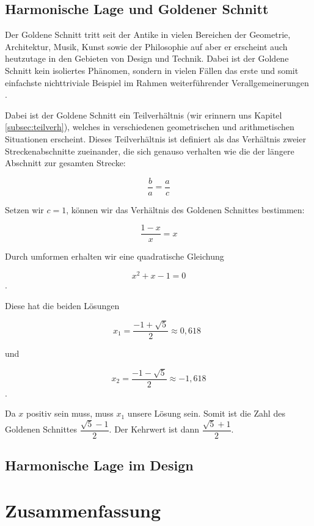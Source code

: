 \documentclass[12pt,a4paper]{article}
\begin{document}
\subsection{Harmonische Lage und Goldener Schnitt}
Der Goldene Schnitt tritt seit der Antike in  vielen Bereichen der Geometrie, Architektur, Musik, Kunst sowie der Philosophie auf aber er erscheint auch heutzutage in den Gebieten von Design und Technik. Dabei ist der Goldene Schnitt kein isoliertes Phänomen, sondern in vielen Fällen das erste und somit einfachste nichttriviale Beispiel im Rahmen weiterführender Verallgemeinerungen \citep[s.][S.~5]{goldenerSchnitt}.

Dabei ist der Goldene Schnitt ein Teilverhältnis (wir erinnern uns Kapitel \ref{subsec:teilverh}), welches in verschiedenen geometrischen und arithmetischen Situationen erscheint. Dieses Teilverhältnis ist definiert als das Verhältnis zweier Streckenabschnitte zueinander, die sich genauso verhalten wie die der längere Abschnitt zur gesamten Strecke:

\[\dfrac{b}{a} = \dfrac{a}{c}\]

Setzen wir $c = 1$, können wir das Verhältnis des Goldenen Schnittes bestimmen:

\[\dfrac{1-x}{x} = x\]

Durch umformen erhalten wir eine quadratische Gleichung

\[x^2 + x - 1 = 0\].

Diese hat die beiden Lösungen

\[x_1 = \dfrac{-1 + \sqrt{5}}{2} \approx 0,618~~ \]

und

\[ x_2 = \dfrac{-1 - \sqrt{5}}{2} \approx -1,618 \].

Da $x$ positiv sein muss, muss $x_1$ unsere Lösung sein. Somit ist die Zahl des Goldenen Schnittes $\dfrac{\sqrt{5}-1}{2}$. Der Kehrwert ist dann $\dfrac{\sqrt{5}+1}{2}$.

\subsection{Harmonische Lage im Design}

\newpage
\section{Zusammenfassung}

\newpage
\listoffigures

\newpage
{}


\end{document}
